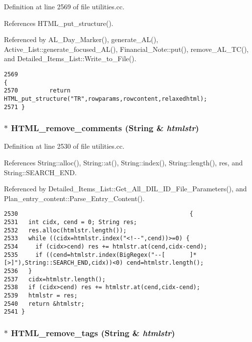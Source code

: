 Definition at line 2569 of file utilities.cc.

References HTML\_\-put\_\-structure().

Referenced by AL\_\-Day\_\-Marker(), generate\_\-AL(), Active\_\-List::generate\_\-focused\_\-AL(), Financial\_\-Note::put(), remove\_\-AL\_\-TC(), and Detailed\_\-Items\_\-List::Write\_\-to\_\-File().



\footnotesize\begin{verbatim}2569                                                                                          {
2570         return HTML_put_structure("TR",rowparams,rowcontent,relaxedhtml);
2571 }
\end{verbatim}\normalsize 
{}
\subsubsection{$\ast$ HTML\_\-remove\_\-comments ({\bf String} \& {\em htmlstr})}\label{dil2al_8hh_a260}




Definition at line 2530 of file utilities.cc.

References String::alloc(), String::at(), String::index(), String::length(), res, and String::SEARCH\_\-END.

Referenced by Detailed\_\-Items\_\-List::Get\_\-All\_\-DIL\_\-ID\_\-File\_\-Parameters(), and Plan\_\-entry\_\-content::Parse\_\-Entry\_\-Content().



\footnotesize\begin{verbatim}2530                                                 {
2531   int cidx, cend = 0; String res;
2532   res.alloc(htmlstr.length());
2533   while ((cidx=htmlstr.index("<!--",cend))>=0) {
2534     if (cidx>cend) res += htmlstr.at(cend,cidx-cend);
2535     if ((cend=htmlstr.index(BigRegex("--[       ]*[>]"),String::SEARCH_END,cidx))<0) cend=htmlstr.length();
2536   }
2537   cidx=htmlstr.length();
2538   if (cidx>cend) res += htmlstr.at(cend,cidx-cend);
2539   htmlstr = res;
2540   return &htmlstr;
2541 }
\end{verbatim}\normalsize 
{}
\subsubsection{$\ast$ HTML\_\-remove\_\-tags ({\bf String} \& {\em htmlstr})}\label{dil2al_8hh_a261}




